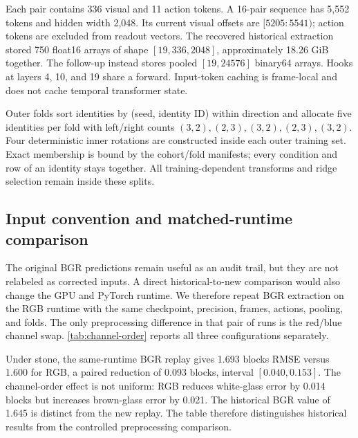\documentclass{article}
\begin{document}
Each pair contains 336 visual and 11 action tokens. A 16-pair sequence has 5,552 tokens and hidden width 2,048. Its current visual offsets are $[5205{:}5541)$; action tokens are excluded from readout vectors. The recovered historical extraction stored 750 float16 arrays of shape $[19,336,2048]$, approximately 18.26 GiB together. The follow-up instead stores pooled $[19,24576]$ binary64 arrays. Hooks at layers 4, 10, and 19 share a forward. Input-token caching is frame-local and does not cache temporal transformer state.

Outer folds sort identities by (seed, identity ID) within direction and allocate five identities per fold with left/right counts $(3,2),(2,3),(3,2),(2,3),(3,2)$. Four deterministic inner rotations are constructed inside each outer training set. Exact membership is bound by the cohort/fold manifests; every condition and row of an identity stays together. All training-dependent transforms and ridge selection remain inside these splits.

\subsection{Input convention and matched-runtime comparison}
\label{sec:temporal}
The original BGR predictions remain useful as an audit trail, but they are not relabeled as corrected inputs. A direct historical-to-new comparison would also change the GPU and PyTorch runtime. We therefore repeat BGR extraction on the RGB runtime with the same checkpoint, precision, frames, actions, pooling, and folds. The only preprocessing difference in that pair of runs is the red/blue channel swap. \autoref{tab:channel-order} reports all three configurations separately.

Under stone, the same-runtime BGR replay gives 1.693 blocks RMSE versus 1.600 for RGB, a paired reduction of 0.093 blocks, interval $[0.040,0.153]$. The channel-order effect is not uniform: RGB reduces white-glass error by 0.014 blocks but increases brown-glass error by 0.021. The historical BGR value of 1.645 is distinct from the new replay. The table therefore distinguishes historical results from the controlled preprocessing comparison.
\end{document}
